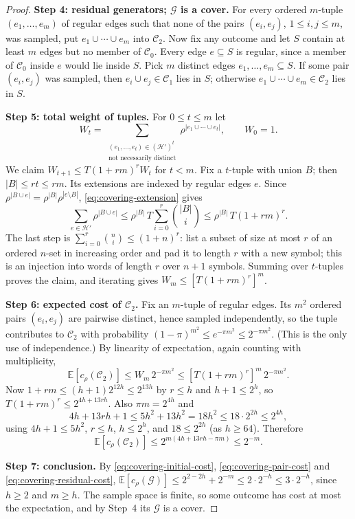 \documentclass[11pt,letterpaper]{article}
\theoremstyle{definition}
\theoremstyle{remark}
\numberwithin{equation}{section}
\newcommand{\step}[1]{\par\smallskip\noindent\textbf{#1}\enspace}
\begin{document}
\begin{proof}
\step{Step 4: residual generators; $\mathcal G$ is a cover.}
For every ordered $m$-tuple $(e_1,\ldots,e_m)$ of regular edges
such that none of the pairs $(e_i,e_j)$, $1\le i,j\le m$, was sampled,
put $e_1\cup\cdots\cup e_m$ into $\mathcal C_2$. Now fix any outcome and
let $S$ contain at least $m$ edges but no member of $\mathcal C_0$.
Every edge $e\subseteq S$ is regular, since a member of $\mathcal C_0$
inside $e$ would lie inside $S$. Pick $m$ distinct edges
$e_1,\ldots,e_m\subseteq S$. If some pair $(e_i,e_j)$ was sampled, then
$e_i\cup e_j\in\mathcal C_1$ lies in $S$; otherwise
$e_1\cup\cdots\cup e_m\in\mathcal C_2$ lies in $S$.

\step{Step 5: total weight of tuples.}
For $0\le t\le m$ let
\[
W_t=
\sum_{\substack{(e_1,\ldots,e_t)\in(\mathcal H')^t\\ \text{not necessarily distinct}}}
  \rho^{|e_1\cup\cdots\cup e_t|},
\qquad W_0=1.
\]
We claim $W_{t+1}\le T(1+rm)^rW_t$ for $t<m$. Fix a $t$-tuple with union
$B$; then $|B|\le rt\le rm$. Its extensions are indexed by regular edges
$e$. Since
$\rho^{|B\cup e|}=\rho^{|B|}\rho^{|e\setminus B|}$,
\eqref{eq:covering-extension} gives
\[
\sum_{e\in\mathcal H'}\rho^{|B\cup e|}
\le\rho^{|B|}\,T\sum_{i=0}^r\binom{|B|}{i}
\le\rho^{|B|}\,T(1+rm)^r.
\]
The last step is $\sum_{i=0}^r\binom ni\le(1+n)^r$: list a subset of size
at most $r$ of an ordered $n$-set in increasing order and pad it to
length $r$ with a new symbol; this is an injection into words of length
$r$ over $n+1$ symbols. Summing over $t$-tuples proves the claim, and
iterating gives $W_m\le[T(1+rm)^r]^m$.

\step{Step 6: expected cost of $\mathcal C_2$.}
Fix an $m$-tuple of regular edges. Its $m^2$ ordered pairs
$(e_i,e_j)$ are pairwise distinct, hence sampled independently, so the
tuple contributes to $\mathcal C_2$ with probability
$(1-\pi)^{m^2}\le e^{-\pi m^2}\le2^{-\pi m^2}$. (This is the only use of
independence.) By linearity of expectation, again counting with
multiplicity,
\[
\mathbb E[c_\rho(\mathcal C_2)]
\le W_m\,2^{-\pi m^2}\le[T(1+rm)^r]^m\,2^{-\pi m^2}.
\]
Now $1+rm\le(h+1)2^{12h}\le2^{13h}$ by $r\le h$ and $h+1\le2^h$, so
$T(1+rm)^r\le2^{4h+13rh}$. Also $\pi m=2^{4h}$ and
\[
4h+13rh+1\le5h^2+13h^2=18h^2\le18\cdot2^{2h}\le2^{4h},
\]
using $4h+1\le5h^2$, $r\le h$, $h\le2^h$, and $18\le2^{2h}$ (as
$h\ge64$). Therefore
\begin{equation}\label{eq:covering-residual-cost}
\mathbb E[c_\rho(\mathcal C_2)]
\le2^{m(4h+13rh-\pi m)}\le2^{-m}.
\end{equation}

\step{Step 7: conclusion.}
By \eqref{eq:covering-initial-cost}, \eqref{eq:covering-pair-cost} and
\eqref{eq:covering-residual-cost},
$\mathbb E[c_\rho(\mathcal G)]\le2^{2-2h}+2^{-m}\le2\cdot2^{-h}
\le3\cdot2^{-h}$, since $h\ge2$ and $m\ge h$. The sample space is finite,
so some outcome has cost at most the expectation, and by Step~4 its
$\mathcal G$ is a cover.
\end{proof}
\end{document}
